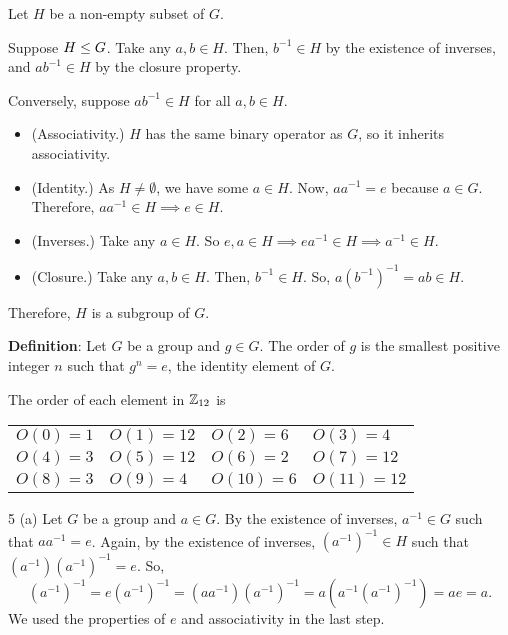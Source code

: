 \documentclass[11pt]{penrose}
\begin{document}
\begin{problem}{3}
    Let $H$ be a non-empty subset of $G$.

    Suppose $H \mathrel{\leq} G$. Take any $a, b \in H$. Then, $b^{-1} \in H$ by the existence of inverses, and $a b^{-1} \in H$ by the closure property.

    Conversely, suppose $a b^{-1} \in H$ for all $a, b \in H$.
    \begin{itemize}
        \item (Associativity.) $H$ has the same binary operator as $G$, so it inherits associativity.
        \item (Identity.) As $H \neq \emptyset$, we have some $a \in H$. Now, $a a^{-1} = e$ because $a \in G$. Therefore, $a a^{-1} \in H \implies e \in H$.
        \item (Inverses.) Take any $a \in H$. So $e, a \in H \implies e a^{-1} \in H \implies a^{-1} \in H$.
        \item (Closure.) Take any $a, b \in H$. Then, $b^{-1} \in H$. So, $a (b^{-1})^{-1} = ab \in H$.
    \end{itemize}
    Therefore, $H$ is a subgroup of $G$.
\end{problem}

\begin{problem}{4}
    \textbf{Definition}: Let $G$ be a group and $g \in G$. The order of $g$ is the smallest positive integer $n$ such that $g^n = e$, the identity element of $G$.

    The order of each element in $\mathbb{Z}_{12}$ is
    \begin{center}
    \begin{tabularx}{0.8\textwidth}{XXXX}
        $O(0)  =  1$ & $O(1)  = 12$ & $O(2)  =  6$ & $O(3)  =  4$\\
        $O(4)  =  3$ & $O(5)  = 12$ & $O(6)  =  2$ & $O(7)  = 12$\\
        $O(8)  =  3$ & $O(9)  =  4$ & $O(10) =  6$ & $O(11) = 12$\\
    \end{tabularx}
    \end{center}
\end{problem}

\begin{problem}{5 (a)}
    Let $G$ be a group and $a \in G$. By the existence of inverses, $a^{-1} \in G$ such that $a a^{-1} = e$. Again, by the existence of inverses, $(a^{-1})^{-1} \in H$ such that $(a^{-1}) (a^{-1})^{-1} = e$. So,
    \begin{equation*}
        (a^{-1})^{-1}
        = e (a^{-1})^{-1}
        = (a a^{-1}) (a^{-1})^{-1}
        = a (a^{-1} (a^{-1})^{-1})
        = a e = a.
    \end{equation*}
    We used the properties of $e$ and associativity in the last step.
\end{problem}
\end{document}
